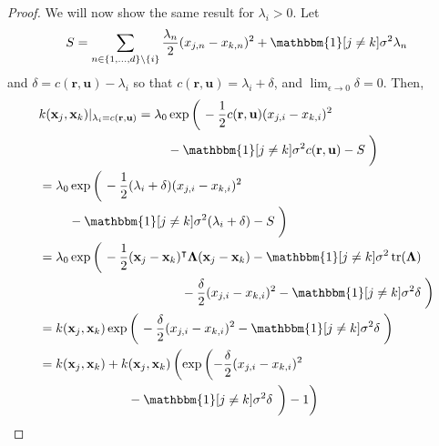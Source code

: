 \documentclass{mpaper}
\DeclareMathOperator{\tr}{tr}
\begin{document}
\begin{proof}
  We will now show the same result for $\lambda_i > 0$. Let
  \[
    S = \sum_{n \in \{ 1, \dots, d \} \setminus \{ i \}} \frac{\lambda_n}{2}
    (x_{j,n} - x_{k,n})^2 + \mathbbm{1}[j \ne k]\sigma^2 \lambda_n
  \]
  and $\delta = c(\mathbf{r}, \mathbf{u}) - \lambda_i$ so that $c(\mathbf{r},
  \mathbf{u}) = \lambda_i + \delta$, and $\lim_{\epsilon \to 0} \delta = 0$.
  Then,
  \begin{align*}
    &k(\mathbf{x}_j, \mathbf{x}_k)|_{\lambda_i = c(\mathbf{r}, \mathbf{u})} = \!\begin{multlined}[t]
      \lambda_0 \exp \left( \vphantom{\frac{1}{2}} \right. -\frac{1}{2} c(\mathbf{r}, \mathbf{u})(x_{j,i} - x_{k,i})^2\\
      - \mathbbm{1}[j \ne k]\sigma^2c(\mathbf{r}, \mathbf{u}) - S \left. \vphantom{\frac{1}{2}} \right)
    \end{multlined} \\
    &= \!\begin{multlined}[t]
      \lambda_0 \exp \left( \vphantom{\frac{1}{2}} \right. -\frac{1}{2} (\lambda_i + \delta)(x_{j,i} - x_{k,i})^2 \\
      - \mathbbm{1}[j \ne k]\sigma^2(\lambda_i + \delta) - S \left. \vphantom{\frac{1}{2}} \right)
    \end{multlined} \\
    &= \!\begin{multlined}[t]
      \lambda_0 \exp \left( \vphantom{\frac{1}{2}} \right. -\frac{1}{2}(\mathbf{x}_j - \mathbf{x}_k)^\intercal \bm\Lambda (\mathbf{x}_j - \mathbf{x}_k) - \mathbbm{1}[j \ne k]\sigma^2\tr(\bm\Lambda) \\
      - \frac{\delta}{2}(x_{j,i} - x_{k,i})^2 - \mathbbm{1}[j \ne k]\sigma^2\delta \left. \vphantom{\frac{1}{2}} \right)
    \end{multlined} \\
    &= k(\mathbf{x}_j, \mathbf{x}_k)\exp \left( \vphantom{\frac{1}{2}} \right. -\frac{\delta}{2}(x_{j,i} - x_{k,i})^2 - \mathbbm{1}[j \ne k]\sigma^2\delta \left. \vphantom{\frac{1}{2}} \right) \\
    &= \!\begin{multlined}[t]
      k(\mathbf{x}_j, \mathbf{x}_k) + k(\mathbf{x}_j, \mathbf{x}_k) \left( \exp
        \left( -\frac{\delta}{2}(x_{j,i} - x_{k,i})^2 \right. \right. \\
      -\mathbbm{1}[j \ne k]\sigma^2\delta \left. \left. \vphantom{\frac{1}{2}} \right) - 1 \right)
    \end{multlined}
  \end{align*}

\end{proof}
\end{document}
